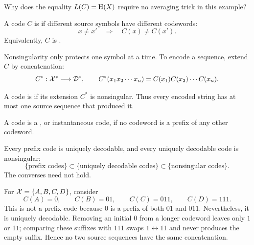 \begin{yourturn}
Why does the equality $L(C)=\mathrm{H}(X)$ require no averaging trick in this example?
\ifshowanswers\else\workspace[2]\fi
{}
\end{yourturn}


\begin{definition}\label{def:nonsingular}
A code $C$ is  if different source symbols have different
codewords:
\[
  x\ne x'\quad\Longrightarrow\quad C(x)\ne C(x').
\]
Equivalently, $C$ is .
\end{definition}

Nonsingularity only protects one symbol at a time. To encode a sequence, extend
$C$ by concatenation:
\[
  C^*:\mathcal{X}^*\longrightarrow\mathcal{D}^*,\qquad
  C^*(x_1x_2\cdots x_n)=C(x_1)C(x_2)\cdots C(x_n).
\]

\begin{definition}\label{def:ud}
A code is  if its extension $C^*$ is nonsingular.
Thus every encoded string has at most one source sequence that produced it.
\end{definition}

\begin{definition}\label{def:prefix}
A code is a , or instantaneous code, if no codeword is a
prefix of any other codeword.
\end{definition}

Every prefix code is uniquely decodable, and every uniquely decodable code is
nonsingular:
\[
  \{\text{prefix codes}\}
  \subset
  \{\text{uniquely decodable codes}\}
  \subset
  \{\text{nonsingular codes}\}.
\]
The converses need not hold.

\begin{example}\label{ex:ud-not-prefix}
For $\mathcal{X}=\{A,B,C,D\}$, consider
\[
  C(A)=0,\qquad C(B)=01,\qquad C(C)=011,\qquad C(D)=111.
\]
This is not a prefix code because $0$ is a prefix of both $01$ and $011$.
Nevertheless, it is uniquely decodable. Removing an initial $0$ from a longer
codeword leaves only $1$ or $11$; comparing these suffixes with $111$ swaps
$1\leftrightarrow11$ and never produces the empty suffix. Hence no two source
sequences have the same concatenation.
\end{example}

